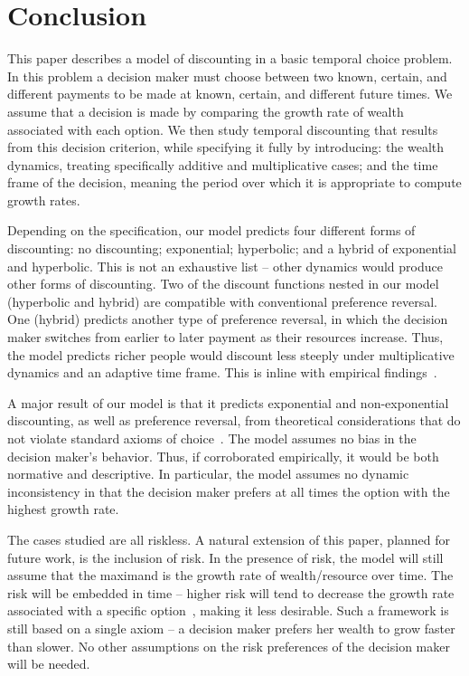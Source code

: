 \section{Conclusion}\label{sec:discussion}

This paper describes a model of discounting in a basic temporal choice problem. In this problem a decision maker must choose between two known, certain, and different payments to be made at known, certain, and different future times. We assume that a decision is made by comparing the growth rate of wealth associated with each option. We then study temporal discounting that results from this decision criterion, while specifying it fully by introducing: the wealth dynamics, treating specifically additive and multiplicative cases; and the time frame of the decision, meaning the period over which it is appropriate to compute growth rates.

Depending on the specification, our model predicts four different forms of discounting: no discounting; exponential; hyperbolic; and a hybrid of exponential and hyperbolic. This is not an exhaustive list -- other dynamics would produce other forms of discounting. Two of the discount functions nested in our model (hyperbolic and hybrid) are compatible with conventional preference reversal. One (hybrid) predicts another type of preference reversal, in which the decision maker switches from earlier to later payment as their resources increase. Thus, the model predicts richer people would discount less steeply under multiplicative dynamics and an adaptive time frame. This is inline with empirical findings~\citep{GreenETAL1996,EpperETAL2018}.

A major result of our model is that it predicts exponential and non-exponential discounting, as well as preference reversal, from theoretical considerations that do not violate standard axioms of choice~\citep{vonNeumannMorgenstern1944}. The model assumes no bias in the decision maker's behavior. Thus, if corroborated empirically, it would be both normative and descriptive. In particular, the model assumes no dynamic inconsistency in that the decision maker prefers at all times the option with the highest growth rate.

The cases studied are all riskless. A natural extension of this paper, planned for future work, is the inclusion of risk. In the presence of risk, the model will still assume that the maximand is the growth rate of wealth/resource over time. The risk will be embedded in time -- higher risk will tend to decrease the growth rate associated with a specific option~\citep{PetersGell-Mann2016}, making it less desirable. Such a framework is still based on a single axiom -- a decision maker prefers her wealth to grow faster than slower. No other assumptions on the risk preferences of the decision maker will be needed.

